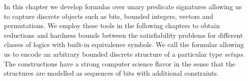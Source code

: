 In this chapter we develop formulas over unary predicate signatures allowing us
to capture discrete objects such as bits, bounded integers, vectors and
permutations.
We employ these tools in the following chapters to obtain reductions and
hardness bounds between the satisfiability problems for different classes of
logics with built-in equivalence symbols.
We call the formulas allowing us to encode an arbitrary bounded discrete
structure of a particular type \emph{setups}.
The constructions have a strong computer science flavor in the sense that the
structures are modelled as sequences of bits with additional constraints.